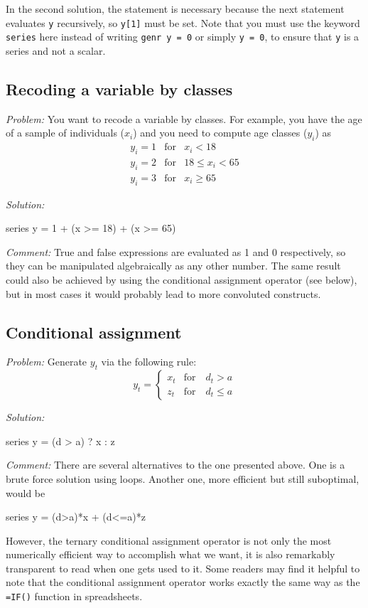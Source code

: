 In the second solution, the statement  is necessary
because the next statement evaluates \texttt{y} recursively, so
\texttt{y[1]} must be set.  Note that you must use the keyword
\texttt{series} here instead of writing \texttt{genr y = 0} or simply
\texttt{y = 0}, to ensure that \texttt{y} is a series and
not a scalar.

\subsection{Recoding a variable by classes}

\emph{Problem:} You want to recode a variable by classes. For example,
you have the age of a sample of individuals ($x_i$) and you need to
compute age classes ($y_i$) as
\begin{eqnarray*}
  y_i = 1 & \mathrm{for} & x_i < 18 \\
  y_i = 2 & \mathrm{for} & 18 \le x_i < 65 \\
  y_i = 3 & \mathrm{for} & x_i \ge 65
\end{eqnarray*}

\emph{Solution:}
\begin{code}
series y = 1 + (x >= 18) + (x >= 65)
\end{code}

\emph{Comment:} True and false expressions are evaluated as 1 and 0
respectively, so they can be manipulated algebraically as any other
number. The same result could also be achieved by using the
conditional assignment operator (see below), but in most cases it
would probably lead to more convoluted constructs.

\subsection{Conditional assignment}

\emph{Problem:} Generate $y_t$ via the following rule:
\[
  y_t = \left\{ 
    \begin{array}{ll} 
      x_t & \mathrm{for} \quad d_t > a \\ 
      z_t & \mathrm{for} \quad d_t \le a 
    \end{array}
    \right. 
\]

\emph{Solution:}
\begin{code}
series y = (d > a) ? x : z
\end{code}

\emph{Comment:} There are several alternatives to the one presented
above. One is a brute force solution using loops. Another one, more
efficient but still suboptimal, would be 
\begin{code}
series y = (d>a)*x + (d<=a)*z  
\end{code}
However, the ternary conditional assignment operator is not only the
most numerically efficient way to accomplish what we want, it is also
remarkably transparent to read when one gets used to it. Some readers
may find it helpful to note that the conditional assignment operator
works exactly the same way as the \texttt{=IF()} function in
spreadsheets.

